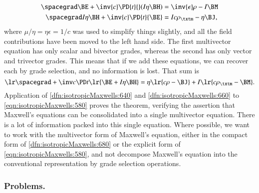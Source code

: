 \begin{dmath}\label{eqn:isotropicMaxwells:560}
\begin{aligned}
\spacegrad \BE        + \inv{c} \PD{t}{} (I \eta \BH) &= \inv{\epsilon}\rho - I \BM  \\
\spacegrad I \eta \BH + \inv{c} \PD{t}{\BE}           &= I c \rho_\txtm - \eta \BJ,
\end{aligned}
\end{dmath}
where \( \mu/\eta = \eta \epsilon = 1/c \) was used to simplify things slightly, and all the field contributions have been moved to the left hand side.
The first multivector equation has only scalar and bivector grades, whereas the second has only vector and trivector grades.  This means that if we add these equations, we can recover each by grade selection, and no information is lost.  That sum is
\begin{dmath}\label{eqn:isotropicMaxwells:580}
\stgrad \lr{ \BE + I \eta \BH } = \eta\lr{ c \rho - \BJ } + I \lr{ c \rho_\txtm - \BM }.
\end{dmath}
Application of \cref{dfn:isotropicMaxwells:640} and \cref{dfn:isotropicMaxwells:660} to
\cref{eqn:isotropicMaxwells:580} proves the theorem, verifying the
assertion that Maxwell's equations can be consolidated into a single multivector equation.
There is a lot of information packed into this single equation.
Where possible, we want to work with the multivector form of Maxwell's equation, either in the
compact form of \cref{dfn:isotropicMaxwells:680} or the explicit form of \cref{eqn:isotropicMaxwells:580},
and not decompose Maxwell's equation into the conventional representation by grade selection operations.

\subsubsection{Problems.}
